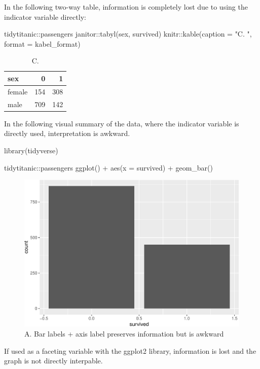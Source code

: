 In the following two-way table, information is completely lost due to
using the indicator variable directly:

\begin{Schunk}
\begin{Sinput}
tidytitanic::passengers %
  janitor::tabyl(sex, survived) %
  knitr::kable(caption = "C. ", format = kabel_format)
\end{Sinput}
\begin{table}

\caption{\label{tab:unnamed-chunk-6}C. }
\centering
\begin{tabular}[t]{l|r|r}
\hline
sex & 0 & 1\\
\hline
female & 154 & 308\\
\hline
male & 709 & 142\\
\hline
\end{tabular}
\end{table}

\end{Schunk}

In the following visual summary of the data, where the indicator
variable is directly used, interpretation is awkward.

\begin{Schunk}
\begin{Sinput}
library(tidyverse)

tidytitanic::passengers %
  ggplot() + 
  aes(x = survived) + 
  geom_bar()
\end{Sinput}
\begin{figure}
\includegraphics[width=0.69\linewidth]{r_journal_files/figure-latex/cars-1} \caption[A]{A. Bar labels + axis label preserves information but is awkward}\label{fig:cars}
\end{figure}
\end{Schunk}

If used as a faceting variable with the ggplot2 library, information is
lost and the graph is not directly interpable.

